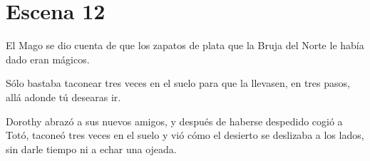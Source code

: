 \chapter{Escena 12}
El Mago se dio cuenta de que los zapatos de plata que la Bruja del Norte le había dado eran mágicos.

Sólo bastaba taconear tres veces en el suelo para que la llevasen, en tres pasos, allá adonde tú desearas ir.

Dorothy abrazó a sus nuevos amigos, y después de haberse despedido cogió a Totó, taconeó tres veces en el suelo y vió cómo el desierto se deslizaba a los lados, sin darle tiempo ni a echar una ojeada. 